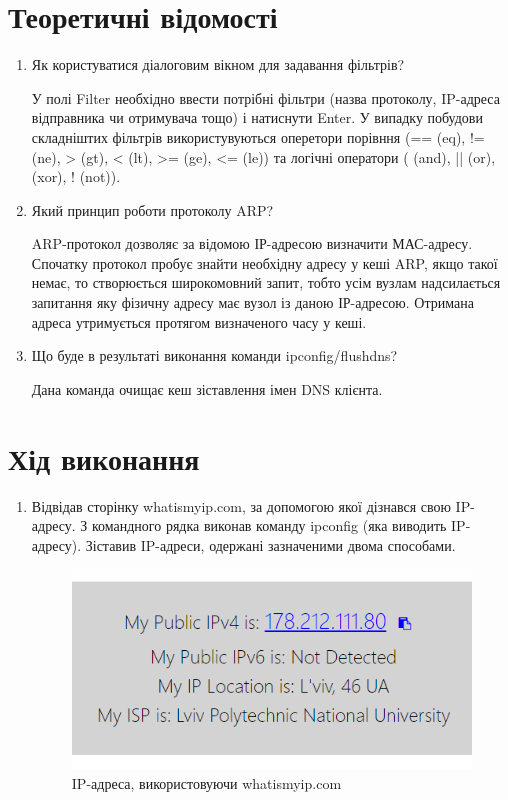 \documentclass{article}
\begin{document}
\begin{normalsize}
\section*{Теоретичні відомості}
\begin{enumerate}
	\item Як користуватися діалоговим вікном для задавання фільтрів?
	
	У полі Filter необхідно ввести потрібні фільтри (назва протоколу, IP-адреса відправника чи отримувача тощо) і натиснути Enter. У випадку побудови складніштих фільтрів використувуються оперетори порівння (== (eq), != (ne), 
	> (gt), < (lt), >= (ge), <= (le)) та логічні оператори ( (and), || (or),  (xor), 
	! (not)).
	
	\item Який принцип роботи протоколу ARP?
	
	ARP-протокол дозволяє за відомою ІР-адресою визначити МАС-адресу. Спочатку протокол пробує знайти необхідну адресу у кеші ARP, якщо такої немає, то створюється широкомовний запит, тобто усім вузлам надсилається запитання яку фізичну адресу має вузол із даною ІР-адресою. Отримана адреса утримується протягом визначеного часу у кеші.
	
	\item Що буде в результаті виконання команди ipconfig/flushdns?
	
	Дана команда очищає кеш зіставлення імен DNS клієнта.
	
\end{enumerate}

	\section*{Хід виконання}
	\begin{enumerate}
\item	Відвідав сторінку whatismyip.com, за допомогою якої дізнався свою IP-адресу. З командного рядка виконав команду ipconfig (яка виводить IP-адресу). Зіставив IP-адреси, одержані зазначеними двома способами.
	
	\begin{figure}[H]
		\centering
		\includegraphics[scale=0.7]{1}
		\caption{ IP-адреса, використовуючи  whatismyip.com}
	\end{figure}


\end{enumerate}
\end{normalsize}
\end{document}
